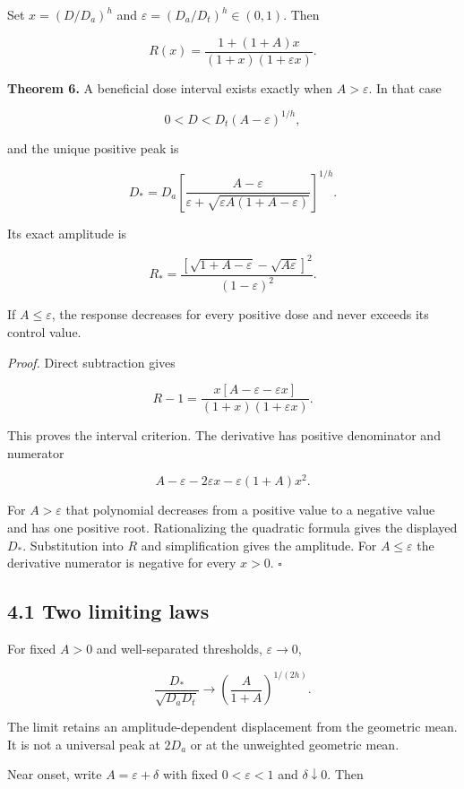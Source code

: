 \documentclass[
  11pt,
  a4paper,
]{article}
\begin{document}
Set \(x=(D/D_a)^h\) and \(\varepsilon=(D_a/D_t)^h\in(0,1)\). Then

\[R(x)=\frac{1+(1+A)x}{(1+x)(1+\varepsilon x)}.\]

\textbf{Theorem 6.} A beneficial dose interval exists exactly when \(A>\varepsilon\). In that case

\[0<D<D_t(A-\varepsilon)^{1/h},\]

and the unique positive peak is

\[D_*=D_a\left[
\frac{A-\varepsilon}{\varepsilon+\sqrt{\varepsilon A(1+A-\varepsilon)}}
\right]^{1/h}.\]

Its exact amplitude is

\[R_*=
\frac{\left[\sqrt{1+A-\varepsilon}-\sqrt{A\varepsilon}\right]^2}
{(1-\varepsilon)^2}.\]

If \(A\le\varepsilon\), the response decreases for every positive dose and never exceeds its control value.

\emph{Proof.} Direct subtraction gives

\[R-1=\frac{x[A-\varepsilon-\varepsilon x]}
{(1+x)(1+\varepsilon x)}.\]

This proves the interval criterion. The derivative has positive denominator and numerator

\[A-\varepsilon-2\varepsilon x-\varepsilon(1+A)x^2.\]

For \(A>\varepsilon\) that polynomial decreases from a positive value to a negative value and has one positive root. Rationalizing the quadratic formula gives the displayed \(D_*\). Substitution into \(R\) and simplification gives the amplitude. For \(A\le\varepsilon\) the derivative numerator is negative for every \(x>0\). \(\square\)

\subsection{4.1 Two limiting laws}\label{two-limiting-laws}

For fixed \(A>0\) and well-separated thresholds, \(\varepsilon\to0\),

\[\frac{D_*}{\sqrt{D_aD_t}}
\longrightarrow\left(\frac{A}{1+A}\right)^{1/(2h)}.\]

The limit retains an amplitude-dependent displacement from the geometric mean. It is not a universal peak at \(2D_a\) or at the unweighted geometric mean.

Near onset, write \(A=\varepsilon+\delta\) with fixed \(0<\varepsilon<1\) and \(\delta\downarrow0\). Then
\end{document}
